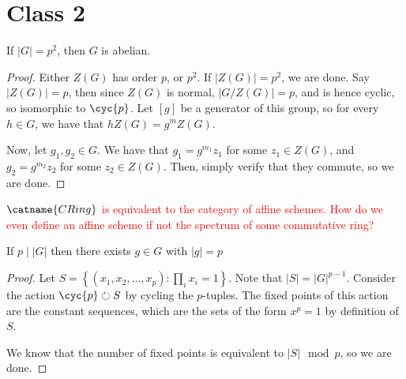 \documentclass[12pt]{scrartcl}
\begin{document}
\section{Class 2}
\begin{proposition}
If $|G| = p^2$, then $G$ is abelian. 
\end{proposition}
\begin{proof}
Either $Z(G)$ has order $p$, or $p^2$.
If $|Z(G)| = p^2$, we are done.
Say $|Z(G)| = p$, then since $Z(G)$ is normal, $|G/Z(G)| = p$, and is hence cyclic, so isomorphic to $\cyc{p}$.
Let $[g]$ be a generator of this group, so for every $h \in G$, we have that $hZ(G) = g^mZ(G)$.

Now, let $g_1, g_2 \in G$.
We have that $g_1 = g^{m_1}z_1$ for some $z_1 \in Z(G)$, and $g_2 = g^{m_2}z_2$ for some $z_2 \in Z(G)$.
Then, simply verify that they commute, so we are done. 
\end{proof}

\textcolor{red}{$\catname{CRing}$ is equivalent to the category of affine schemes. How do we even define an affine scheme if not the spectrum of some commutative ring?}

\begin{proposition}
	If $p \mid |G|$ then there exists $g \in G$ with $|g| = p$ 
\end{proposition}

\begin{proof}
Let $S = \left\{(x_1, x_2, \dots, x_p) : \prod_i x_i = 1\right\}$.
Note that $|S| = |G|^{p-1}$.
Consider the action $\cyc{p} \circlearrowright S$ by cycling the $p$-tuples.
The fixed points of this action are the constant sequences, which are the sets of the form $x^p = 1$ by definition of $S$.

We know that the number of fixed points is equivalent to $|S| \mod p$, so we are done.
\end{proof}
\end{document}
